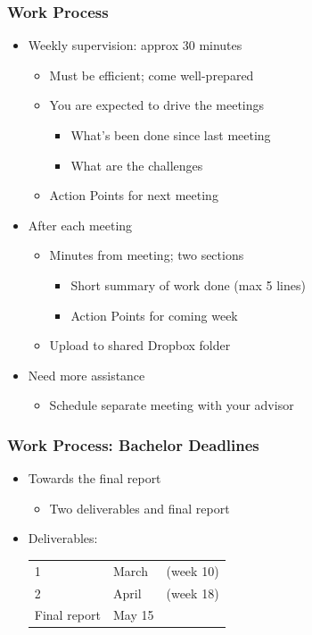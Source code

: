 \documentclass[hyperref={pdfpagelabels=false}, aspectratio=1610]{beamer}
\begin{document}
\begin{frame}
\frametitle{Work Process}
\begin{block}{}
 \begin{itemize}
  \item Weekly supervision: approx 30 minutes
  \begin{itemize}
  	\item Must be efficient; come well-prepared
  	\item You are expected to drive the meetings
	\begin{itemize}
		\item What's been done since last meeting
		\item What are the challenges
	\end{itemize}
  	\item Action Points for next meeting
  \end{itemize}
  \item<2-> After each meeting
  \begin{itemize}
  	\item<2-> Minutes from meeting;  two sections
	\begin{itemize}
		\item<2-> Short summary of work done (max 5 lines)
		\item<2-> Action Points for coming week
	\end{itemize}
	\item<2-> Upload to shared Dropbox folder
  \end{itemize}
 \item<3-> Need more assistance
 \begin{itemize}
 	\item<3-> Schedule separate meeting with your advisor
 \end{itemize}
 \end{itemize}
\end{block}
\end{frame}

\begin{frame}
\frametitle{Work Process: Bachelor Deadlines}
\begin{block}{}
 \begin{itemize}
  \item Towards the final report
  \begin{itemize}
  	\item Two deliverables and final report
  \end{itemize}
  \item Deliverables:\\
  \begin{tabular}{lll}
  1 & March & (week 10) \\
  2 & April & (week 18) \\
  Final report & May 15 & \\
  \end{tabular}
 \end{itemize}
\end{block}
\end{frame}
\end{document}

